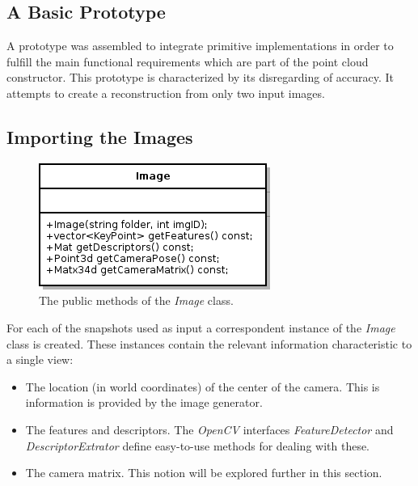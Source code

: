 \documentclass[12pt,a4paper,twoside,openright]{report}
\begin{document}
\subsection{A Basic Prototype}
A prototype was assembled to integrate primitive implementations in order to fulfill the main functional requirements which are part of the point cloud constructor. This prototype is characterized by its disregarding of accuracy. It attempts to create a reconstruction from only two input images. 

\subsection{Importing the Images}
\begin{figure}
\centerline{\includegraphics[scale=0.7]{figs/image.png}}
\caption{The public methods of the \emph{Image} class.}
\end{figure}
For each of the snapshots used as input a correspondent instance of the \emph{Image} class is created. These instances contain the relevant information characteristic to a single view:
\begin{itemize}
\item The location (in world coordinates) of the center of the camera. This is information is provided by the image generator.
\item The features and descriptors. The \emph{OpenCV} interfaces \emph{FeatureDetector} and \emph{DescriptorExtrator} define easy-to-use methods for dealing with these.
\item The camera matrix. This notion will be explored further in this section.
\end{itemize}
\end{document}
